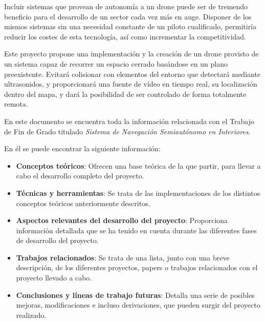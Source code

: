 \noindent Incluir sistemas que provean de autonomía a un drone puede ser de tremendo beneficio para el desarrollo de un sector cada vez más en auge. Disponer de los mismos sistemas sin una necesidad constante de un piloto cualificado, permitiría reducir los costes de esta tecnología, así como incrementar la competitividad.

Este proyecto propone una implementación y la creación de un drone provisto de un sistema capaz de recorrer un espacio cerrado basándose en un plano preexistente. Evitará colisionar con elementos del entorno que detectará mediante ultrasonidos, y proporcionará una fuente de vídeo en tiempo real, su localización dentro del mapa, y dará la posibilidad de ser controlado de forma totalmente remota.

\noindent En este documento se encuentra toda la información relacionada con el Trabajo de Fin de Grado titulado \textit{Sistema de Navegación Semiautónomo en Interiores}.

\noindent En él se puede encontrar la siguiente información:
\begin{itemize}
\item \textbf{Conceptos teóricos}: Ofrecen una base teórica de la que partir, para llevar a cabo el desarrollo completo del proyecto.
\item \textbf{Técnicas y herramientas}: Se trata de las implementaciones de los distintos conceptos teóricos anteriormente descritos.
\item \textbf{Aspectos relevantes del desarrollo del proyecto}: Proporciona información detallada que se ha tenido en cuenta durante las diferentes fases de desarrollo del proyecto.
\item \textbf{Trabajos relacionados}: Se trata de una lista, junto con una breve descripción, de los diferentes proyectos, papers o trabajos relacionados con el proyecto llevado a cabo.
\item \textbf{Conclusiones y líneas de trabajo futuras}: Detalla una serie de posibles mejoras, modificaciones e incluso derivaciones, que pueden surgir del proyecto realizado.
\end{itemize}
